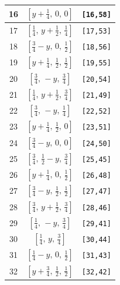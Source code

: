 \documentclass[fleqn,8pt]{jsarticle}
\begin{document}
\begin{longtable}{ccc}
16 & $\left[ y + \frac{1}{4},\, 0,\, 0 \right]$ & {\tt [16,58]} \\ \hline
17 & $\left[ \frac{1}{4},\, y + \frac{1}{2},\, \frac{1}{4} \right]$ & {\tt [17,53]} \\ \hline
18 & $\left[ \frac{3}{4} - y,\, 0,\, \frac{1}{2} \right]$ & {\tt [18,56]} \\ \hline
19 & $\left[ y + \frac{1}{4},\, \frac{1}{2},\, \frac{1}{2} \right]$ & {\tt [19,55]} \\ \hline
20 & $\left[ \frac{3}{4},\, - y,\, \frac{3}{4} \right]$ & {\tt [20,54]} \\ \hline
21 & $\left[ \frac{1}{4},\, y + \frac{1}{2},\, \frac{3}{4} \right]$ & {\tt [21,49]} \\ \hline
22 & $\left[ \frac{3}{4},\, - y,\, \frac{1}{4} \right]$ & {\tt [22,52]} \\ \hline
23 & $\left[ y + \frac{1}{4},\, \frac{1}{2},\, 0 \right]$ & {\tt [23,51]} \\ \hline
24 & $\left[ \frac{3}{4} - y,\, 0,\, 0 \right]$ & {\tt [24,50]} \\ \hline
25 & $\left[ \frac{3}{4},\, \frac{1}{2} - y,\, \frac{3}{4} \right]$ & {\tt [25,45]} \\ \hline
26 & $\left[ y + \frac{1}{4},\, 0,\, \frac{1}{2} \right]$ & {\tt [26,48]} \\ \hline
27 & $\left[ \frac{3}{4} - y,\, \frac{1}{2},\, \frac{1}{2} \right]$ & {\tt [27,47]} \\ \hline
28 & $\left[ \frac{3}{4},\, y + \frac{1}{2},\, \frac{3}{4} \right]$ & {\tt [28,46]} \\ \hline
29 & $\left[ \frac{1}{4},\, - y,\, \frac{3}{4} \right]$ & {\tt [29,41]} \\ \hline
30 & $\left[ \frac{1}{4},\, y,\, \frac{3}{4} \right]$ & {\tt [30,44]} \\ \hline
31 & $\left[ \frac{1}{4} - y,\, 0,\, \frac{1}{2} \right]$ & {\tt [31,43]} \\ \hline
32 & $\left[ y + \frac{3}{4},\, \frac{1}{2},\, \frac{1}{2} \right]$ & {\tt [32,42]} \\
\end{longtable}
\renewcommand{\arraystretch}{1.2}
\end{document}
